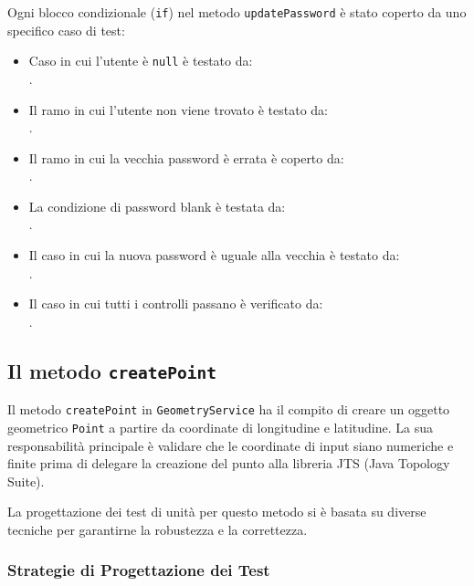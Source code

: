 Ogni blocco condizionale (\texttt{if}) nel metodo \texttt{updatePassword} è stato coperto da uno specifico caso di test:
\begin{itemize}
    \item Caso in cui l'utente è \texttt{null} è testato da:\\ .
    \item Il ramo in cui l'utente non viene trovato è testato da:\\ .
    \item Il ramo in cui la vecchia password è errata è coperto da:\\ .
    \item La condizione di password blank è testata da:\\ .
    \item Il caso in cui la nuova password è uguale alla vecchia è testato da:\\ .
    \item Il caso in cui tutti i controlli passano è verificato da:\\ .
\end{itemize}

\subsection{Il metodo \texttt{createPoint}}
Il metodo \texttt{createPoint} in \texttt{GeometryService} ha il compito di creare un oggetto geometrico \texttt{Point} a partire da coordinate di longitudine e latitudine. La sua responsabilità principale è validare che le coordinate di input siano numeriche e finite prima di delegare la creazione del punto alla libreria JTS (Java Topology Suite).

La progettazione dei test di unità per questo metodo si è basata su diverse tecniche per garantirne la robustezza e la correttezza.

\subsubsection{Strategie di Progettazione dei Test}

